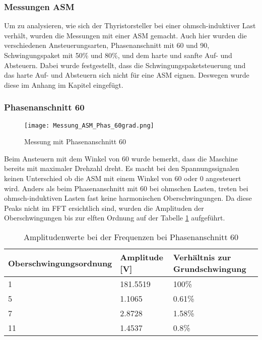 \newpage
\subsubsection{Messungen ASM}
Um zu analysieren, wie sich der Thyristorsteller bei einer ohmsch-induktiver Last verhält, wurden die Messungen mit einer ASM gemacht. Auch hier wurden die verschiedenen Ansteuerungsarten, Phasenanschnitt mit 60\textdegree \hspace{0.02cm} und 90\textdegree \hspace{0.02cm}, Schwingungspaket mit 50\% und 80\%, und dem harte und sanfte Auf- und Absteuern. Dabei wurde festgestellt, dass die Schwingungspaketsteuerung und das harte Auf- und Absteuern sich nicht für eine ASM eignen. 
Deswegen wurde diese im Anhang im Kapitel  eingefügt. 

\subsubsection*{Phasenanschnitt 60\textdegree}
\begin{figure}[ht!]
	\centering
	\texttt{[image: Messung\_ASM\_Phas\_60grad.png]}	
	\caption{Messung mit Phasenanschnitt 60\textdegree}\label{fig:Mess_ASM_Phas60}
\end{figure}

Beim Ansteuern mit dem Winkel von 60\textdegree \hspace{0.02cm} wurde bemerkt, dass die Maschine bereits mit maximaler Drehzahl dreht. Es macht bei den Spannungssignalen keinen Unterschied ob die ASM mit einem Winkel von 60\textdegree \hspace{0.02cm} oder 0\textdegree \hspace{0.02cm} angesteuert wird.
Anders als beim Phasenanschnitt mit 60\textdegree\hspace{0.02cm} bei ohmschen Lasten, treten bei ohmsch-induktiven Lasten fast keine harmonischen Oberschwingungen. Da diese Peaks nicht im FFT ersichtlich sind, wurden die Amplituden der Oberschwingungen bis zur elften Ordnung auf der Tabelle \ref{tab:Mess_Spannung_ASM_Phas60} aufgeführt. 

\begin{table}[ht!]
	\centering
	\begin{tabular}{|l|l|l|}
		\hline
		Oberschwingungsordnung & Amplitude {[}V{]} & Verhältnis zur Grundschwingung \\ \hline
		1                      & 181.5519          & 100\%                          \\ \hline
		5                      & 1.1065            & 0.61\%                         \\ \hline
		7                      & 2.8728            & 1.58\%                         \\ \hline
		11                     & 1.4537            & 0.8\%                          \\ \hline
	\end{tabular}
\caption{Amplitudenwerte bei der Frequenzen bei Phasenanschnitt 60\textdegree}\label{tab:Mess_Spannung_ASM_Phas60}
\end{table}


